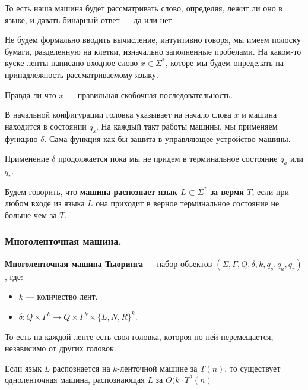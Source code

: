 То есть наша машина будет рассматривать слово, определяя, лежит ли оно в языке, и давать бинарный ответ --- да или нет.

Не будем формально вводить вычисление, интуитивно говоря, мы имеем полоску бумаги, разделенную на клетки, изначально заполненные пробелами.
На каком-то куске ленты написано входное слово $x \in \Sigma^*$, которе мы будем определать на принадлежность рассматриваемому языку.

\begin{example}
   Правда ли что $x$ --- правильная скобочная последовательность.
\end{example}

В начальной конфигурации головка указывает на начало слова $x$ и машина находится в состоянии  $q_s$. 
На каждый такт работы машины, мы применяем функцию  $\delta$. Сама функция как бы зашита в управляющее устройство машины. 

Применение  $\delta$ продолжается пока мы не придем в терминальное состояние  $q_a$ или  $q_r$.

\begin{Def}
     Будем говорить, что \textbf{машина распознает язык $L \subset \Sigma^*$ за вермя $T$}, 
     если при любом входе из языка $L$ она приходит в верное терминальное состояние не больше чем за $T$. 
\end{Def}

\subsubsection{Многоленточная машина.}
\begin{Def}
    \textbf{Многоленточная машина Тьюринга} --- набор объектов $(\Sigma, \Gamma, Q, \delta, k, q_s, q_a, q_r)$, где:
    \begin{itemize}
        \item $k$ --- количество лент.
        \item $\delta: Q \times \Gamma^k \rightarrow Q \times \Gamma^k \times \{L, N, R\} ^ k$.
    \end{itemize}
\end{Def}

То есть на каждой ленте есть своя головка, котороя по ней перемещается, независимо от других головок.

\begin{theorem}
    Если язык $L$ распознается на  $k$-ленточной машине за  $T(n)$, то существует одноленточная машина, распознающая $L$ за  $O(k \cdot T^2(n)$ 
\end{theorem}

